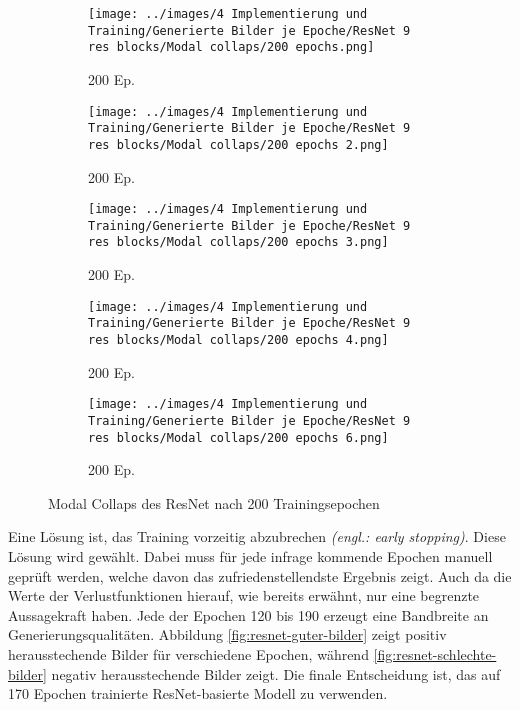 \begin{figure}[H]
    \centering
    \begin{subfigure}[b]{0.12\textwidth}
        \centering
        \texttt{[image: ../images/4 Implementierung und Training/Generierte Bilder je Epoche/ResNet 9 res blocks/Modal collaps/200 epochs.png]}
        \caption{200 Ep.}
    \end{subfigure}
    \hspace{3em}%
    \begin{subfigure}[b]{0.12\textwidth}
        \centering
        \texttt{[image: ../images/4 Implementierung und Training/Generierte Bilder je Epoche/ResNet 9 res blocks/Modal collaps/200 epochs 2.png]}
        \caption{200 Ep.}
    \end{subfigure}
    \hspace{3em}%
    \begin{subfigure}[b]{0.12\textwidth}
        \centering
        \texttt{[image: ../images/4 Implementierung und Training/Generierte Bilder je Epoche/ResNet 9 res blocks/Modal collaps/200 epochs 3.png]}
        \caption{200 Ep.}
    \end{subfigure}
    \hspace{3em}%
    \begin{subfigure}[b]{0.12\textwidth}
        \centering
        \texttt{[image: ../images/4 Implementierung und Training/Generierte Bilder je Epoche/ResNet 9 res blocks/Modal collaps/200 epochs 4.png]}
        \caption{200 Ep.}
    \end{subfigure}
    \hspace{3em}%
    \begin{subfigure}[b]{0.12\textwidth}
    \centering
    \texttt{[image: ../images/4 Implementierung und Training/Generierte Bilder je Epoche/ResNet 9 res blocks/Modal collaps/200 epochs 6.png]}
    \caption{200 Ep.}
\end{subfigure}
        \caption{Modal Collaps des ResNet nach 200 Trainingsepochen}
        \label{fig:modal-collaps}
\end{figure}

Eine Lösung ist, das Training vorzeitig abzubrechen \emph{(engl.: early stopping)}. Diese Lösung wird gewählt. Dabei muss für jede infrage kommende Epochen manuell geprüft werden, welche davon das zufriedenstellendste Ergebnis zeigt. Auch da die Werte der Verlustfunktionen hierauf, wie bereits erwähnt, nur eine begrenzte Aussagekraft haben. Jede der Epochen 120 bis 190 erzeugt eine Bandbreite an Generierungsqualitäten. Abbildung \ref{fig:resnet-guter-bilder} zeigt positiv herausstechende Bilder für verschiedene Epochen, während \ref{fig:resnet-schlechte-bilder} negativ herausstechende Bilder zeigt. Die finale Entscheidung ist, das auf 170 Epochen trainierte ResNet-basierte Modell zu verwenden.

